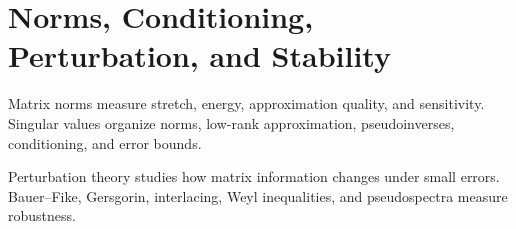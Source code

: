 \section{Norms, Conditioning, Perturbation, and Stability}

%

Matrix norms measure stretch, energy, approximation quality, and sensitivity. Singular values organize norms, low-rank approximation, pseudoinverses, conditioning, and error bounds.

Perturbation theory studies how matrix information changes under small errors. Bauer--Fike, Gersgorin, interlacing, Weyl inequalities, and pseudospectra measure robustness.










